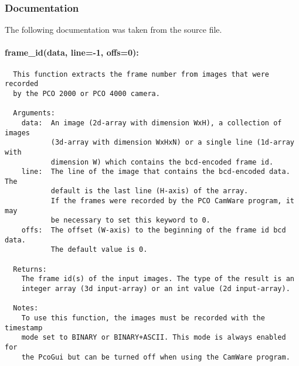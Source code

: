 \documentclass[11pt, a4paper]{scrartcl}
\begin{document}
\subsubsection{Documentation}
The following documentation was taken from the source file.

\paragraph{frame\_id(data, line=-1, offs=0):}
\begin{verbatim}
  This function extracts the frame number from images that were recorded
  by the PCO 2000 or PCO 4000 camera.

  Arguments:
    data:  An image (2d-array with dimension WxH), a collection of images
           (3d-array with dimension WxHxN) or a single line (1d-array with
           dimension W) which contains the bcd-encoded frame id.
    line:  The line of the image that contains the bcd-encoded data. The
           default is the last line (H-axis) of the array.
           If the frames were recorded by the PCO CamWare program, it may
           be necessary to set this keyword to 0.
    offs:  The offset (W-axis) to the beginning of the frame id bcd data.
           The default value is 0.

  Returns:
    The frame id(s) of the input images. The type of the result is an
    integer array (3d input-array) or an int value (2d input-array).
  
  Notes:
    To use this function, the images must be recorded with the timestamp
    mode set to BINARY or BINARY+ASCII. This mode is always enabled for
    the PcoGui but can be turned off when using the CamWare program.
\end{verbatim}
\end{document}
